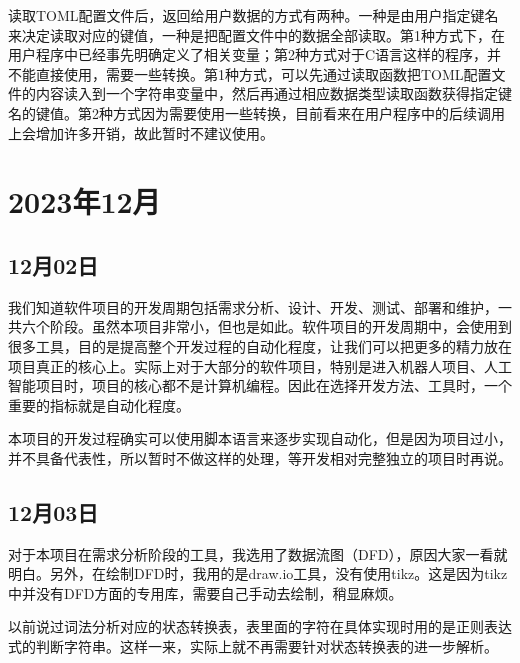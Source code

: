 读取TOML配置文件后，返回给用户数据的方式有两种。一种是由用户指定键名来决定读取对应的键值，一种是把配置文件中的数据全部读取。第1种方式下，在用户程序中已经事先明确定义了相关变量；第2种方式对于C语言这样的程序，并不能直接使用，需要一些转换。第1种方式，可以先通过读取函数把TOML配置文件的内容读入到一个字符串变量中，然后再通过相应数据类型读取函数获得指定键名的键值。第2种方式因为需要使用一些转换，目前看来在用户程序中的后续调用上会增加许多开销，故此暂时不建议使用。


\section{2023年12月}


\subsection{12月02日}
我们知道软件项目的开发周期包括需求分析、设计、开发、测试、部署和维护，一共六个阶段。虽然本项目非常小，但也是如此。软件项目的开发周期中，会使用到很多工具，目的是提高整个开发过程的自动化程度，让我们可以把更多的精力放在项目真正的核心上。实际上对于大部分的软件项目，特别是进入机器人项目、人工智能项目时，项目的核心都不是计算机编程。因此在选择开发方法、工具时，一个重要的指标就是自动化程度。

本项目的开发过程确实可以使用脚本语言来逐步实现自动化，但是因为项目过小，并不具备代表性，所以暂时不做这样的处理，等开发相对完整独立的项目时再说。


\subsection{12月03日}
对于本项目在需求分析阶段的工具，我选用了数据流图（DFD），原因大家一看就明白。另外，在绘制DFD时，我用的是draw.io工具，没有使用tikz。这是因为tikz中并没有DFD方面的专用库，需要自己手动去绘制，稍显麻烦。

以前说过词法分析对应的状态转换表，表里面的字符在具体实现时用的是正则表达式的判断字符串。这样一来，实际上就不再需要针对状态转换表的进一步解析。